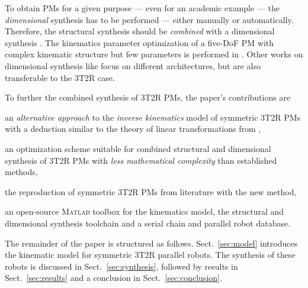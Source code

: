 \documentclass[
	graybox,
	vecphys] %
	{svmult}
\begin{document}
To obtain PMs for a given purpose --- even for an academic example --- the \emph{dimensional} synthesis has to be performed --- either manually or automatically.
Therefore, the structural synthesis should be \emph{combined} with a dimensional synthesis \cite{FrindtKreHes2010}.
The kinematics parameter optimization of a five-DoF PM with complex kinematic structure but few parameters is performed in  \cite{SongLiaSunDon2014}.
Other works on dimensional synthesis like \cite{FrindtKreHes2010} focus on different architectures, but are also transferable to the 3T2R case. %



To further the combined synthesis of 3T2R PMs, the paper's contributions are
\begin{compactitem}
\item an \emph{alternative approach} to the \emph{inverse kinematics} model of symmetric 3T2R PMs with a deduction similar to the theory of linear transformations from \cite{Gogu2008},
\item an optimization scheme suitable for combined structural and dimensional synthesis of 3T2R PMs with \emph{less mathematical complexity} than established methods,
\item the reproduction of symmetric 3T2R PMs from literature with the new method, 
\item an open-source \textsc{Matlab} toolbox for the kinematics model, the structural and dimensional synthesis toolchain and a serial chain and parallel robot database.
\end{compactitem}

The remainder of the paper is structured as follows. Sect.~\ref{sec:model} introduces the kinematic model for symmetric 3T2R parallel robots.
The synthesis of these robots is discussed in Sect.~\ref{sec:synthesis}, followed by results in Sect.~\ref{sec:results} and a conclusion in Sect.~\ref{sec:conclusion}.
\end{document}
